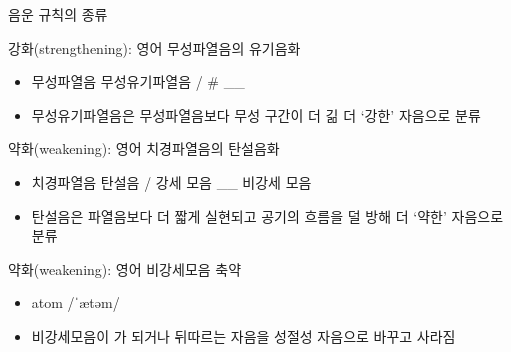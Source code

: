\documentclass[11pt, aspectratio=169]{beamer}
\newcommand{\textds}[1]{{\ipafont #1}}
\begin{document}
\begin{frame}[t]{음운 규칙의 종류}
    \begin{block}{강화(strengthening): 영어 무성파열음의 유기음화}
        \begin{itemize}
            \item 무성파열음 \rightarrow 무성유기파열음 / \# \_\_
            \item [] {\small 무성유기파열음은 무성파열음보다 무성 구간이 더 긺 \rightarrow 더 ‘강한’ 자음으로 분류}
        \end{itemize}
    \end{block}    
    \begin{block}{약화(weakening): 영어 치경파열음의 탄설음화}
        \begin{itemize}
            \item 치경파열음 \rightarrow 탄설음 / 강세 모음 \_\_ 비강세 모음
            \item [] {\small 탄설음은 파열음보다 더 짧게 실현되고 공기의 흐름을 덜 방해 \rightarrow 더 ‘약한’ 자음으로 분류}
        \end{itemize}
    \end{block}
    \begin{block}{약화(weakening): 영어 비강세모음 축약}
        \begin{itemize}
            \item atom \textds{/ˈætəm/} \rightarrow \textds{[ˈæɾm̩]} 
            \item [] {\small 비강세모음이 \textds{[ə]}가 되거나 뒤따르는 자음을 성절성 자음으로 바꾸고 사라짐}
        \end{itemize}
    \end{block}
\end{frame}
\end{document}
